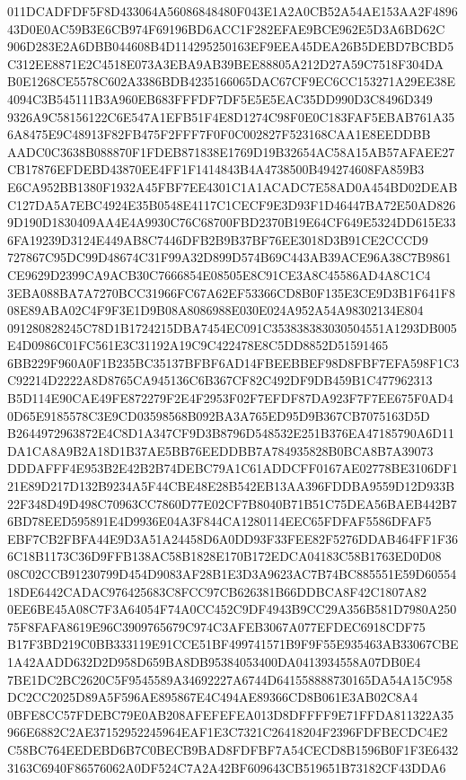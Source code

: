 \documentclass[UTF8,fontset=fandol,zihao=-4,a4paper]{ctexart}
\begin{document}
{{011DCADFDF5F8D433064A56086848480F043E1A2A0CB52A54AE153AA2F489643D0E0AC59B3E6CB974F69196BD6ACC1F282EFAE9BCE962E5D3A6BD62C
906D283E2A6DBB044608B4D114295250163EF9EEA45DEA26B5DEBD7BCBD5C312EE8871E2C4518E073A3EBA9AB39BEE88805A212D27A59C7518F304DA
B0E1268CE5578C602A3386BDB4235166065DAC67CF9EC6CC153271A29EE38E4094C3B545111B3A960EB683FFFDF7DF5E5E5EAC35DD990D3C8496D349
9326A9C58156122C6E547A1EFB51F4E8D1274C98F0E0C183FAF5EBAB761A356A8475E9C48913F82FB475F2FFF7F0F0C002827F523168CAA1E8EEDDBB
AADC0C3638B088870F1FDEB871838E1769D19B32654AC58A15AB57AFAEE27CB17876EFDEBD43870EE4FF1F1414843B4A4738500B494274608FA859B3
E6CA952BB1380F1932A45FBF7EE4301C1A1ACADC7E58AD0A454BD02DEABC127DA5A7EBC4924E35B0548E4117C1CECF9E3D93F1D46447BA72E50AD826
9D190D1830409AA4E4A9930C76C68700FBD2370B19E64CF649E5324DD615E336FA19239D3124E449AB8C7446DFB2B9B37BF76EE3018D3B91CE2CCCD9
727867C95DC99D48674C31F99A32D899D574B69C443AB39ACE96A38C7B9861CE9629D2399CA9ACB30C7666854E08505E8C91CE3A8C45586AD4A8C1C4
3EBA088BA7A7270BCC31966FC67A62EF53366CD8B0F135E3CE9D3B1F641F808E89ABA02C4F9F3E1D9B08A8086988E030E024A952A54A98302134E804
091280828245C78D1B1724215DBA7454EC091C353838383030504551A1293DB005E4D0986C01FC561E3C31192A19C9C422478E8C5DD8852D51591465
6BB229F960A0F1B235BC35137BFBF6AD14FBEEBBEF98D8FBF7EFA598F1C3C92214D2222A8D8765CA945136C6B367CF82C492DF9DB459B1C477962313
B5D114E90CAE49FE872279F2E4F2953F02F7EFDF87DA923F7F7EE675F0AD40D65E9185578C3E9CD03598568B092BA3A765ED95D9B367CB7075163D5D
B2644972963872E4C8D1A347CF9D3B8796D548532E251B376EA47185790A6D11DA1CA8A9B2A18D1B37AE5BB76EEDDBB7A784935828B0BCA8B7A39073
DDDAFFF4E953B2E42B2B74DEBC79A1C61ADDCFF0167AE02778BE3106DF121E89D217D132B9234A5F44CBE48E28B542EB13AA396FDDBA9559D12D933B
22F348D49D498C70963CC7860D77E02CF7B8040B71B51C75DEA56BAEB442B76BD78EED595891E4D9936E04A3F844CA1280114EEC65FDFAF5586DFAF5
EBF7CB2FBFA44E9D3A51A24458D6A0DD93F33FEE82F5276DDAB464FF1F366C18B1173C36D9FFB138AC58B1828E170B172EDCA04183C58B1763ED0D08
08C02CCB91230799D454D9083AF28B1E3D3A9623AC7B74BC885551E59D6055418DE6442CADAC976425683C8FCC97CB626381B66DDBCA8F42C1807A82
0EE6BE45A08C7F3A64054F74A0CC452C9DF4943B9CC29A356B581D7980A25075F8FAFA8619E96C3909765679C974C3AFEB3067A077EFDEC6918CDF75
B17F3BD219C0BB333119E91CCE51BF499741571B9F9F55E935463AB33067CBE1A42AADD632D2D958D659BA8DB95384053400DA0413934558A07DB0E4
7BE1DC2BC2620C5F9545589A34692227A6744D641558888730165DA54A15C958DC2CC2025D89A5F596AE895867E4C494AE89366CD8B061E3AB02C8A4
0BFE8CC57FDEBC79E0AB208AFEFEFEA013D8DFFFF9E71FFDA811322A35966E6882C2AE37152952245964EAF1E3C7321C26418204F2396FDFBECDC4E2
C58BC764EEDEBD6B7C0BECB9BAD8FDFBF7A54CECD8B1596B0F1F3E64323163C6940F86576062A0DF524C7A2A42BF609643CB519651B73182CF43DDA6
}}
\end{document}
